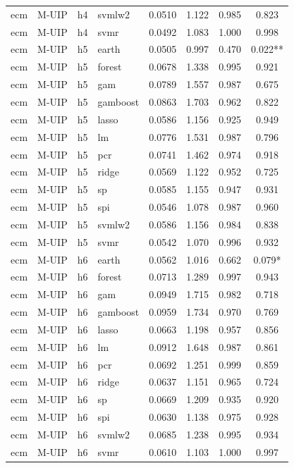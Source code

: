 \begin{ThreePartTable}
\begin{longtable}[t]{llclcccc}
ecm & M-UIP & h4 & svmlw2 & 0.0510 & 1.122 & 0.985 & 0.823\\
ecm & M-UIP & h4 & svmr & 0.0492 & 1.083 & 1.000 & 0.998\\
\addlinespace
ecm & M-UIP & h5 & earth & 0.0505 & 0.997 & 0.470 & 0.022**\\
ecm & M-UIP & h5 & forest & 0.0678 & 1.338 & 0.995 & 0.921\\
ecm & M-UIP & h5 & gam & 0.0789 & 1.557 & 0.987 & 0.675\\
ecm & M-UIP & h5 & gamboost & 0.0863 & 1.703 & 0.962 & 0.822\\
ecm & M-UIP & h5 & lasso & 0.0586 & 1.156 & 0.925 & 0.949\\
ecm & M-UIP & h5 & lm & 0.0776 & 1.531 & 0.987 & 0.796\\
ecm & M-UIP & h5 & pcr & 0.0741 & 1.462 & 0.974 & 0.918\\
ecm & M-UIP & h5 & ridge & 0.0569 & 1.122 & 0.952 & 0.725\\
ecm & M-UIP & h5 & sp & 0.0585 & 1.155 & 0.947 & 0.931\\
ecm & M-UIP & h5 & spi & 0.0546 & 1.078 & 0.987 & 0.960\\
ecm & M-UIP & h5 & svmlw2 & 0.0586 & 1.156 & 0.984 & 0.838\\
ecm & M-UIP & h5 & svmr & 0.0542 & 1.070 & 0.996 & 0.932\\
\addlinespace
ecm & M-UIP & h6 & earth & 0.0562 & 1.016 & 0.662 & 0.079*\\
ecm & M-UIP & h6 & forest & 0.0713 & 1.289 & 0.997 & 0.943\\
ecm & M-UIP & h6 & gam & 0.0949 & 1.715 & 0.982 & 0.718\\
ecm & M-UIP & h6 & gamboost & 0.0959 & 1.734 & 0.970 & 0.769\\
ecm & M-UIP & h6 & lasso & 0.0663 & 1.198 & 0.957 & 0.856\\
ecm & M-UIP & h6 & lm & 0.0912 & 1.648 & 0.987 & 0.861\\
ecm & M-UIP & h6 & pcr & 0.0692 & 1.251 & 0.999 & 0.859\\
ecm & M-UIP & h6 & ridge & 0.0637 & 1.151 & 0.965 & 0.724\\
ecm & M-UIP & h6 & sp & 0.0669 & 1.209 & 0.935 & 0.920\\
ecm & M-UIP & h6 & spi & 0.0630 & 1.138 & 0.975 & 0.928\\
ecm & M-UIP & h6 & svmlw2 & 0.0685 & 1.238 & 0.995 & 0.934\\
ecm & M-UIP & h6 & svmr & 0.0610 & 1.103 & 1.000 & 0.997\\

\end{longtable}
\end{ThreePartTable}
